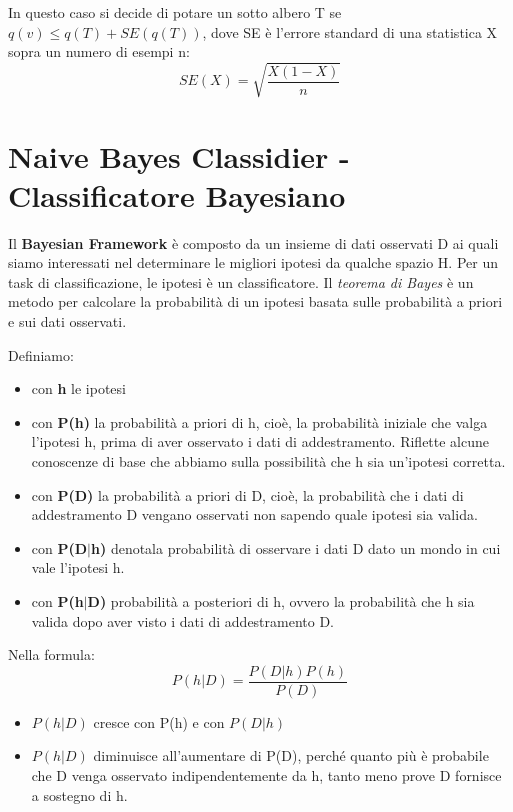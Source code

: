 \documentclass[a4paper]{extarticle}
\begin{document}
In questo caso si decide di potare un sotto albero T se $q(v) \leq q(T) + SE(q(T))$, dove SE è l'errore standard di una statistica X sopra un numero di esempi n:
\begin{equation*}
SE(X) = \sqrt{\dfrac{X(1-X)}{n}}
\end{equation*}

\section{Naive Bayes Classidier - Classificatore Bayesiano}

Il \textbf{Bayesian Framework} è composto da un insieme di dati osservati D ai quali siamo interessati nel determinare le migliori ipotesi da qualche spazio H. Per un task di classificazione, le ipotesi è un classificatore. Il \textit{teorema di Bayes} è un metodo per calcolare la probabilità di un ipotesi basata sulle probabilità a priori e sui dati osservati.

Definiamo:
\begin{itemize}
\item con \textbf{h} le ipotesi

\item con \textbf{P(h)} la probabilità a priori di h, cioè, la probabilità iniziale che valga l'ipotesi h, prima di aver osservato i dati di addestramento. Riflette alcune conoscenze di base che abbiamo sulla possibilità che h sia un'ipotesi corretta.

\item con \textbf{P(D)} la probabilità a priori di D, cioè, la probabilità che i dati di addestramento D vengano osservati non sapendo quale ipotesi sia valida.

\item con \textbf{P(D$|$h)} denotala probabilità di osservare i dati D dato un mondo in cui vale l'ipotesi h.

\item con \textbf{P(h$|$D)} probabilità a posteriori di h, ovvero la probabilità che h sia valida dopo aver visto i dati di addestramento D.
\end{itemize}

Nella formula:
\begin{equation*}
P(h|D) = \dfrac{P(D|h)P(h)}{P(D)}
\end{equation*}

\begin{itemize}
\item $P(h|D)$ cresce con P(h) e con $P(D|h)$
\item $P(h|D)$ diminuisce all'aumentare di P(D), perché quanto più è probabile che D venga osservato indipendentemente da h, tanto meno prove D fornisce a sostegno di h.
\end{itemize}
\end{document}
